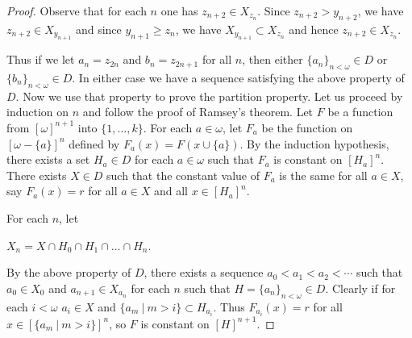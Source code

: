 \documentclass[8pt]{article}
\theoremstyle{definition}
\theoremstyle{definition}
\theoremstyle{definition}
\theoremstyle{definition}
\theoremstyle{definition}
\theoremstyle{definition}
\theoremstyle{definition}
\theoremstyle{definition}
\theoremstyle{definition}
\theoremstyle{definition}
\theoremstyle{definition}
\theoremstyle{definition}
\theoremstyle{definition}
\theoremstyle{definition}
\theoremstyle{question}
\begin{document}
\begin{proof}
  Observe that for each $n$ one has $z_{n + 2} \in X_{z_n}$. Since $z_{n + 2} > y_{n + 2}$,
  we have $z_{n + 2} \in X_{y_{n + 1}}$ and since $y_{n + 1} \geq z_n$, we have $X_{y_{n + 1}} \subset X_{z_n}$
  and hence $z_{n + 2} \in X_{z_n}$.

  Thus if we let $a_n = z_{2n}$ and $b_n = z_{2n + 1}$ for all $n$,
  then either $\{ a_n \}_{n < \omega} \in D$ or $\{ b_n \}_{n < \omega} \in D$. In either case we have a sequence satisfying
  the above property of $D$. Now we use that property to prove the partition property.
  Let us proceed by induction on $n$ and follow the proof of Ramsey's theorem.
  Let $F$ be a function from $[\omega]^{n + 1}$ into $\{ 1, \ldots, k\}$.
  For each $a \in \omega$, let $F_{a}$ be the function on $[\omega - \{a\}]^n$ defined by $F_a(x) = F(x \cup \{a\})$.
  By the induction hypothesis, there exists a set $H_a \in D$ for each $a \in \omega$ such that $F_a$ is constant
  on $[H_a]^n$. There exists $X \in D$ such that the constant value of $F_a$ is the same
  for all $a \in X$, say $F_a(x) = r$ for all $a \in X$ and all $x \in [H_a]^n$.

  For each $n$, let
  \begin{center}
    $X_n = X \cap H_0 \cap H_1 \cap \ldots \cap H_n$.
  \end{center}
  By the above property of $D$, there exists a sequence $a_0 < a_1 < a_2 < \cdots$ such that
  $a_0 \in X_0$ and $a_{n + 1} \in X_{a_n}$ for each $n$ such that $H = \{ a_n \}_{n < \omega} \in D$.
  Clearly if for each $i < \omega$ $a_i \in X$ and $\{ a_m  \: | \: m > i\} \subset H_{a_i}$.
  Thus $F_{a_i}(x) = r$ for all $x \in [\{ a_m  \: | \: m > i\}]^n$, so $F$ is constant on $[H]^{n + 1}$.
\end{proof}




\end{document}
